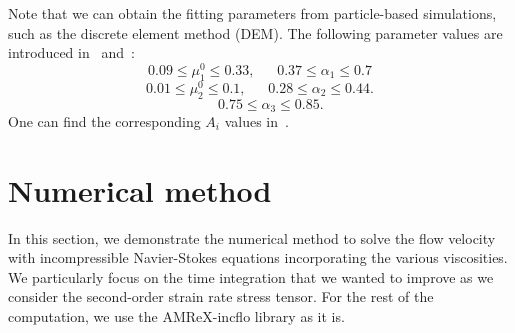 \noindent
Note that we can obtain the fitting parameters from particle-based simulations, such as the discrete element method (DEM). The following parameter values are introduced in~\cite{jop_constitutive_2006} and~\cite{srivastava_viscometric_2021}:
    \[
    0.09 \leq \mu_1^0 \leq 0.33, 
    \ \ \ \ \ \ \ 
    0.37 \leq \alpha_1 \leq 0.7
    \]
        \[
    0.01 \leq \mu_2^0 \leq 0.1, 
    \ \ \ \ \ \ \ 
    0.28 \leq \alpha_2 \leq 0.44.
    \]
            \[
    \ \ \ \ \ \ \ 
    0.75 \leq \alpha_3 \leq 0.85.
    \]
     One can find the corresponding $A_i$ values in~\cite{srivastava_viscometric_2021}.

\section{Numerical method}
In this section, we demonstrate the numerical method to solve the flow velocity with incompressible Navier-Stokes equations incorporating the various viscosities. We particularly focus on the time integration that we wanted to improve as we consider the second-order strain rate stress tensor.
For the rest of the computation, we use the AMReX-incflo library as it is.

